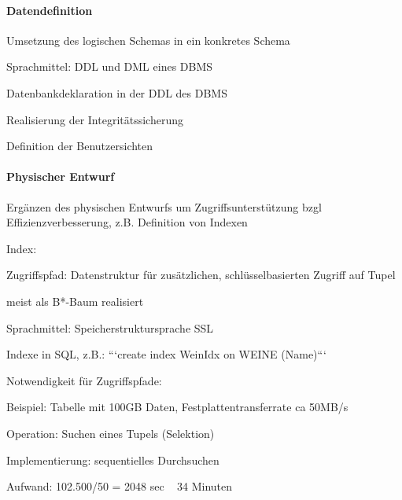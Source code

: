 \documentclass[a4paper]{article}
\begin{document}
\begin{multicols}{3}
\paragraph{Datendefinition}
\begin{itemize*}
    \item Umsetzung des logischen Schemas in ein konkretes Schema
    \item Sprachmittel: DDL und DML eines DBMS
    \begin{itemize*}
        \item Datenbankdeklaration in der DDL des DBMS
        \item Realisierung der Integritätssicherung
        \item Definition der Benutzersichten
    \end{itemize*}
\end{itemize*}

\paragraph{Physischer Entwurf}
\begin{itemize*}
    \item Ergänzen des physischen Entwurfs um Zugriffsunterstützung bzgl Effizienzverbesserung, z.B. Definition von Indexen
    \item Index:
    \begin{itemize*}
        \item Zugriffspfad: Datenstruktur für zusätzlichen, schlüsselbasierten Zugriff auf Tupel
        \item meist als B*-Baum realisiert
    \end{itemize*}
    \item Sprachmittel: Speicherstruktursprache SSL
\end{itemize*}

Indexe in SQL, z.B.: ```create index WeinIdx on WEINE (Name)```

Notwendigkeit für Zugriffspfade:
\begin{itemize*}
    \item Beispiel: Tabelle mit 100GB Daten, Festplattentransferrate ca 50MB/s
    \item Operation: Suchen eines Tupels (Selektion)
    \item Implementierung: sequentielles Durchsuchen
    \item Aufwand: 102.500/50 = 2048 sec ~ 34 Minuten
\end{itemize*}


\end{multicols}
\end{document}
